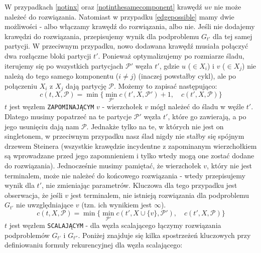 \documentclass[12pt, oneside]{report}
\begin{document}
W przypadkach \ref{notinx} oraz \ref{notinthesamecomponent} krawędź $uv$ nie może należeć do rozwiązania. Natomiast w przypadku \ref{edgepossible} mamy dwie możliwości - albo włączamy krawędź do rozwiązania, albo nie. Jeśli nie dodajemy krawędzi do rozwiązania, przepisujemy wynik dla podproblemu $G_{t'}$ dla tej samej partycji. W przeciwnym przypadku, nowo dodawana krawędź musiała połączyć dwa rozłączne bloki partycji $t'$. Ponieważ optymalizujemy po rozmiarze śladu, iterujemy się po wszystkich partycjach $\mathcal{P}'$ węzła $t'$, gdzie $u$ ($\in X_i$) i $v$ ($\in X_j$) nie należą do tego samego komponentu ($i \neq j$) (inaczej powstałby cykl), ale po połączeniu $X_i$ z $X_j$ dają partycję $\mathcal{P}$. Możemy to zapisać następująco:
$$c(t, X, \mathcal{P}) = \min \big\{ \min\limits_{\mathcal{P}'} c(t', X, \mathcal{P}') + 1, \quad c(t', X, \mathcal{P}) \big\}$$
\newline
$t$ jest węzłem \texttt{ZAPOMINAJĄCYM} $v$ - wierzchołek $v$ mógł należeć do śladu w węźle $t'$. Dlatego musimy popatrzeć na te partycje $\mathcal{P}'$ węzła $t'$, które go zawierają, a po jego usunięciu dają nam $\mathcal{P}$. Jednakże tylko na te, w których nie jest on singletonem, w przeciwnym przypadku nasz ślad nigdy nie stałby się spójnym drzewem Steinera (wszystkie krawędzie incydentne z zapominanym wierzchołkiem są wprowadzane przed jego zapomnieniem i tylko wtedy mogą one zostać dodane do rozwiązania). Jednocześnie musimy pamiętać, że wierzchołek $v$, który nie jest terminalem, może nie należeć do końcowego rozwiązania - wtedy przepisujemy wynik dla $t'$, nie zmieniając parametrów. Kluczowa dla tego przypadku jest obserwacja, że jeśli $v$ jest terminalem, nie istnieją rozwiązania dla podproblemu $G_{t'}$ nie uwzględniające $v$ (tzn. ich wynikiem jest $\infty$).
$$c(t, X, \mathcal{P}) = \min \big\{ \min\limits_{\mathcal{P}'} c(t', X \cup \{v\}, \mathcal{P}'), \quad c(t', X, \mathcal{P}) \big\}$$
\newline
$t$ jest węzłem \texttt{SCALAJĄCYM} - dla węzła scalającego łączymy rozwiązania podproblemów $G_{t'}$ i $G_{t''}$. Poniżej znajduje się kilka spostrzeżeń kluczowych przy definiowaniu formuły rekurencyjnej dla węzła scalającego:
\end{document}
